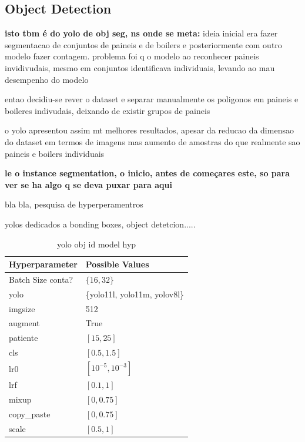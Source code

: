 \documentclass[conference]{IEEEtran}
\begin{document}
\subsection{Object Detection}

\textbf{isto tbm é do yolo de obj seg, ns onde se meta:} ideia inicial era fazer segmentacao de conjuntos de paineis e de boilers e posteriormente com outro modelo fazer contagem. problema foi q o modelo ao reconhecer paineis invidivudais, mesmo em conjuntos identificava individuais, levando ao mau desempenho do modelo

entao decidiu-se rever o dataset e separar manualmente os poligonos em paineis e boileres indivudais, deixando de existir grupos de paineis

o yolo apresentou assim mt melhores resultados, apesar da reducao da dimensao do dataset em termos de imagens mas aumento de amostras do que realmente sao paineis e boilers individuais

\textbf{le o instance segmentation, o inicio, antes de começares este, so para ver se ha algo q se deva puxar para aqui}

bla bla, pesquisa de hyperperamentros

yolos dedicados a bonding boxes, object detetcion.....


\begin{table}[H]
\centering
\caption{yolo obj id model hyp}
\label{parametrosobjid}
\begin{tabular}{ll}
\toprule
\textbf{Hyperparameter} & \textbf{Possible Values} \\
\midrule
Batch Size conta? & $\{16, 32\}$ \\
yolo & \{yolo11l, yolo11m, yolov8l\} \\
imgsize & 512 \\
augment & True \\
patiente & $[15, 25]$ \\
cls & $[0.5, 1.5]$ \\
lr0 & $[10^{-5}, 10^{-3}]$ \\
lrf & $[0.1, 1]$ \\
mixup & $[0, 0.75]$ \\
copy\_paste & $[0, 0.75]$ \\
scale & $[0.5, 1]$ \\
\bottomrule
\end{tabular}
\end{table}
\end{document}
